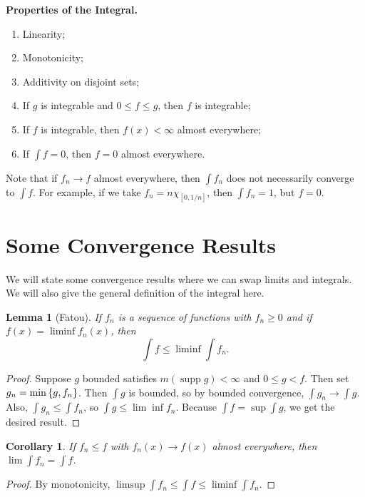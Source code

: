 \documentclass[leqno, openany]{memoir}
\newtheorem{cor}[thm]{Corollary}
\newtheorem{lem}[thm]{Lemma}
\theoremstyle{definition}
\theoremstyle{remark}
\theoremstyle{plain}
\theoremstyle{definition}
\theoremstyle{remark}
\DeclareMathOperator{\supp}{supp}
\begin{document}
\textbf{Properties of the Integral.} \begin{enumerate} \item Linearity; \item
    Monotonicity; \item Additivity on disjoint sets; \item If $g$ is integrable
    and $0 \leq f \leq g$, then $f$ is integrable; \item If $f$ is integrable,
    then $f(x) < \infty$ almost everywhere; \item If $\int f = 0$, then $f = 0$
    almost everywhere.  \end{enumerate}

Note that if $f_n \to f$ almost everywhere, then $\int f_n$ does not
necessarily converge to $\int f$. For example, if we take $f_n = n
\chi_{[0,1/n]}$, then $\int f_n = 1$, but $f = 0$.

\section{Some Convergence Results}%

We will state some convergence results where we can swap limits and integrals.
We will also give the general definition of the integral here.

\begin{lem}[Fatou] If $f_n$ is a sequence of functions with $f_n \geq 0$ and if
    $f(x) = \liminf f_n(x)$, then \[ \int f \leq \liminf \int f_n. \] \end{lem}

\begin{proof} Suppose $g$ bounded satisfies $m(\supp g) < \infty$ and $0 \leq g
    < f$. Then set $g_n = \min \qty{g,f_n}$. Then $\int g$ is bounded, so by
    bounded convergence, $\int g_n \to \int g$. Also, $\int g_n \leq \int f_n$,
    so $\int g \leq \lim \inf f_n$. Because $\int f = \sup \int g$, we get the
    desired result.  \end{proof}

\begin{cor} If $f_n \leq f$ with $f_n(x) \to f(x)$ almost everywhere, then
$\lim \int f_n = \int f$.  \end{cor}

\begin{proof} By monotonicity, $\limsup \int f_n \leq \int f \leq \liminf \int
f_n$.  \end{proof}
\end{document}

